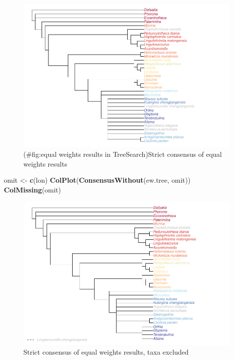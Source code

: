 \documentclass[]{book}
\newenvironment{Shaded}{\begin{snugshade}}{\end{snugshade}}
\newcommand{\KeywordTok}[1]{\textcolor[rgb]{0.13,0.29,0.53}{\textbf{#1}}}
\newcommand{\StringTok}[1]{\textcolor[rgb]{0.31,0.60,0.02}{#1}}
\newcommand{\NormalTok}[1]{#1}
\theoremstyle{definition}
\theoremstyle{definition}
\theoremstyle{definition}
\theoremstyle{remark}
\begin{document}
\begin{figure}
\centering
\includegraphics{Brachiopod_phylogeny_files/figure-latex/equal weights results in TreeSearch-1.pdf}
\caption{(\#fig:equal weights results in TreeSearch)Strict consensus of
equal weights results}
\end{figure}

\begin{Shaded}
\begin{Highlighting}[]
\NormalTok{omit <-}\StringTok{ }\KeywordTok{c}\NormalTok{(lon)}
\KeywordTok{ColPlot}\NormalTok{(}\KeywordTok{ConsensusWithout}\NormalTok{(ew.tree, omit))}
\KeywordTok{ColMissing}\NormalTok{(omit)}
\end{Highlighting}
\end{Shaded}

\begin{figure}
\centering
\includegraphics{Brachiopod_phylogeny_files/figure-latex/unnamed-chunk-3-1.pdf}
\caption{\label{fig:unnamed-chunk-3}Strict consensus of equal weights
results, taxa excluded}
\end{figure}
\end{document}
